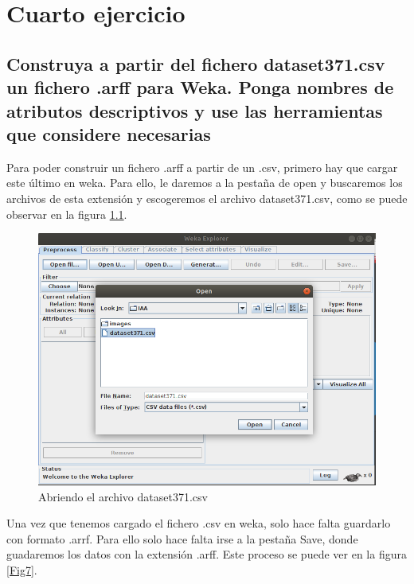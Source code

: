 \documentclass[11pt,twoside,a4paper]{book}
\begin{document}
\chapter{Cuarto ejercicio}
\section{Construya a partir del fichero dataset371.csv un \break fichero .arff para Weka. Ponga nombres de
\break atributos descriptivos y use las herramientas que \break considere necesarias}
Para poder construir un fichero .arff a partir de un .csv, primero hay que cargar
este último en weka. Para ello, le daremos a la pestaña de open y buscaremos los
archivos de esta extensión y escogeremos el archivo dataset371.csv, como se puede
observar en la figura \ref{Fig6}.

\begin{figure}[H]
   \begin{center}
	     \includegraphics[width=\textwidth]{ejercicio4_1.png}
   \end{center}
	\caption{Abriendo el archivo dataset371.csv}
	\label{Fig6}
\end{figure}

Una vez que tenemos cargado el fichero .csv en weka, solo hace falta guardarlo con
formato .arrf. Para ello solo hace falta irse a la pestaña Save, donde guadaremos
los datos con la extensión .arff. Este proceso se puede ver en la figura \ref{Fig7}.
\end{document}
